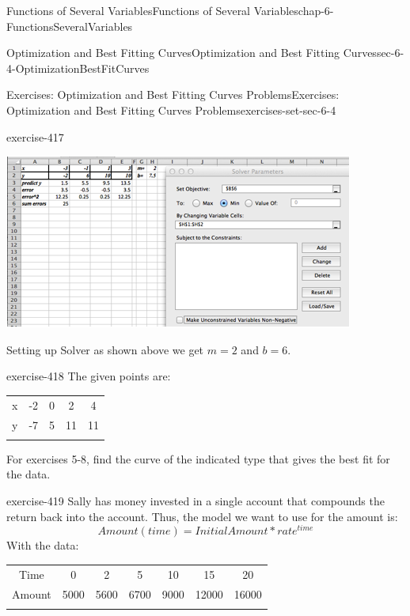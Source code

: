 \documentclass[oneside,10pt,]{book}
\numberwithin{equation}{section}
\newcommand{\hrulethin}  {\noalign{\hrule height 0.04em}}
\newcommand{\hrulethick} {\noalign{\hrule height 0.11em}}
\begin{document}
\begin{chapterptx}{Functions of Several Variables}{}{Functions of Several Variables}{}{}{chap-6-FunctionsSeveralVariables}
\begin{sectionptx}{Optimization and Best Fitting Curves}{}{Optimization and Best Fitting Curves}{}{}{sec-6-4-OptimizationBestFitCurves}
\begin{exercises-subsection-numberless}{Exercises: Optimization and Best Fitting Curves Problems}{}{Exercises: Optimization and Best Fitting Curves Problems}{}{}{exercises-set-sec-6-4}
\begin{divisionexercise}{3}{}{}{exercise-417}
\begin{sidebyside}{1}{0}{0}{0}
\begin{sbspanel}{1}
\includegraphics[width=1\linewidth]{images/sec6-4-sol3c.png}
\end{sbspanel}%
\end{sidebyside}%
\par
\hypertarget{p-2500}{}%
Setting up Solver as shown above we get \(m = 2\) and \(b = 6\).%
\end{divisionexercise}%
\begin{divisionexercise}{4}{}{}{exercise-418}%
\hypertarget{p-2501}{}%
The given points are:%
\begin{sidebyside}{1}{0}{0}{0}%
\begin{sbspanel}{1}%
{\centering%
\begin{tabular}{ccccc}\hrulethick
x&-2&0&2&4\tabularnewline\hrulethin
y&-7&5&11&11\tabularnewline\hrulethin
\end{tabular}
\par}
\end{sbspanel}%
\end{sidebyside}%
\end{divisionexercise}%
\hypertarget{p-2502}{}%
For exercises 5-8, find the curve of the indicated type that gives the best fit for the data.%
\begin{divisionexercise}{5}{}{}{exercise-419}%
\hypertarget{p-2503}{}%
Sally has money invested in a single account that compounds the return back into the account.  Thus, the model we want to use for the amount is:%
%
\begin{equation*}
Amount(time)=InitialAmount* rate^{time}
\end{equation*}
\hypertarget{p-2504}{}%
With the data:%
\begin{sidebyside}{1}{0}{0}{0}%
\begin{sbspanel}{1}%
{\centering%
\begin{tabular}{ccccccc}\hrulethick
Time&0&2&5&10&15&20\tabularnewline\hrulethin
Amount&\textdollar{}5000&\textdollar{}5600&\textdollar{}6700&\textdollar{}9000&\textdollar{}12000&\textdollar{}16000\tabularnewline\hrulethin

\end{tabular}}
\end{sbspanel}
\end{sidebyside}
\end{divisionexercise}
\end{exercises-subsection-numberless}
\end{sectionptx}
\end{chapterptx}
\end{document}
